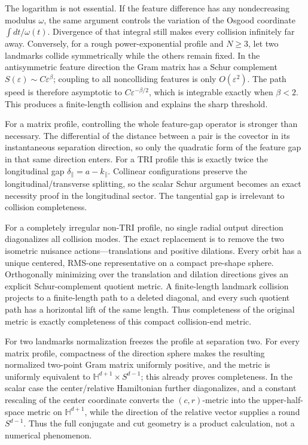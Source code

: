 \documentclass[11pt]{article}
\begin{document}
The logarithm is not essential.  If the feature difference has any
nondecreasing modulus \(\omega\), the same argument controls the variation
of the Osgood coordinate \(\int dt/\omega(t)\).  Divergence of that integral
still makes every collision infinitely far away.  Conversely, for a rough
power-exponential profile and \(N\ge3\), let two landmarks collide
symmetrically while the others remain fixed.  In the antisymmetric feature
direction the Gram matrix has a Schur complement
\(S(\varepsilon)\sim C\varepsilon^\beta\); coupling to all noncolliding
features is only \(O(\varepsilon^2)\).  The path speed is therefore
asymptotic to \(C\varepsilon^{-\beta/2}\), which is integrable exactly when
\(\beta<2\).  This produces a finite-length collision and explains the
sharp threshold.

For a matrix profile, controlling the whole feature-gap operator is stronger
than necessary.  The differential of the distance between a pair is the
covector in its instantaneous separation direction, so only the quadratic
form of the feature gap in that same direction enters.  For a TRI profile
this is exactly twice the longitudinal gap
\(\delta_\parallel=a-k_\parallel\).  Collinear configurations preserve the
longitudinal/transverse splitting, so the scalar Schur argument becomes an
exact necessity proof in the longitudinal sector.  The tangential gap is
irrelevant to collision completeness.

For a completely irregular non-TRI profile, no single radial output
direction diagonalizes all collision modes.  The exact replacement is to
remove the two isometric nuisance actions---translations and positive
dilations.  Every orbit has a unique centered, RMS-one representative on a
compact pre-shape sphere.  Orthogonally minimizing over the translation and
dilation directions gives an explicit Schur-complement quotient metric.
A finite-length landmark collision projects to a finite-length path to a
deleted diagonal, and every such quotient path has a horizontal lift of the
same length.  Thus completeness of the original metric is exactly
completeness of this compact collision-end metric.

For two landmarks normalization freezes the profile at separation two.
For every matrix profile, compactness of the direction sphere makes the
resulting normalized two-point Gram matrix uniformly positive, and the
metric is uniformly equivalent to
\(\mathbb H^{d+1}\times S^{d-1}\); this already proves completeness.  In the
scalar case the center/relative Hamiltonian further diagonalizes, and a
constant rescaling of the center coordinate converts the \((c,r)\)-metric
into the upper-half-space metric on \(\mathbb H^{d+1}\), while the direction
of the relative vector supplies a round \(S^{d-1}\).  Thus the full
conjugate and cut geometry is a product calculation, not a numerical
phenomenon.
\end{document}
